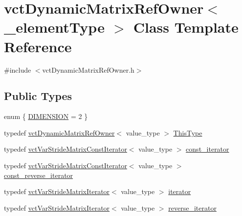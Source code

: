 \hypertarget{classvct_dynamic_matrix_ref_owner}{}\section{vct\+Dynamic\+Matrix\+Ref\+Owner$<$ \+\_\+element\+Type $>$ Class Template Reference}
\label{classvct_dynamic_matrix_ref_owner}


{\ttfamily \#include $<$vct\+Dynamic\+Matrix\+Ref\+Owner.\+h$>$}

\subsection*{Public Types}
\begin{DoxyCompactItemize}
\item 
enum \{ \hyperlink{classvct_dynamic_matrix_ref_owner_af13d59ea37e2deaafd66ed04d22db916ae19d71a7e9eb96879fbbe0b8acea6fae}{D\+I\+M\+E\+N\+S\+I\+O\+N} = 2
 \}
\item 
typedef \hyperlink{classvct_dynamic_matrix_ref_owner}{vct\+Dynamic\+Matrix\+Ref\+Owner}$<$ value\+\_\+type $>$ \hyperlink{classvct_dynamic_matrix_ref_owner_a004c89da7faff7d573988fc3b9ec43d9}{This\+Type}
\item 
typedef \hyperlink{classvct_var_stride_matrix_const_iterator}{vct\+Var\+Stride\+Matrix\+Const\+Iterator}$<$ value\+\_\+type $>$ \hyperlink{classvct_dynamic_matrix_ref_owner_a7a8df19473cc2e95e25c4d1bf4bacbe4}{const\+\_\+iterator}
\item 
typedef \hyperlink{classvct_var_stride_matrix_const_iterator}{vct\+Var\+Stride\+Matrix\+Const\+Iterator}$<$ value\+\_\+type $>$ \hyperlink{classvct_dynamic_matrix_ref_owner_a50c3b985899b0d6cb2f9fab9f8305207}{const\+\_\+reverse\+\_\+iterator}
\item 
typedef \hyperlink{classvct_var_stride_matrix_iterator}{vct\+Var\+Stride\+Matrix\+Iterator}$<$ value\+\_\+type $>$ \hyperlink{classvct_dynamic_matrix_ref_owner_aaf9f6aaf86c05aec0bcd354d40c11863}{iterator}
\item 
typedef \hyperlink{classvct_var_stride_matrix_iterator}{vct\+Var\+Stride\+Matrix\+Iterator}$<$ value\+\_\+type $>$ \hyperlink{classvct_dynamic_matrix_ref_owner_a133b22e9f6b4e7a20998ad3db72ed6c3}{reverse\+\_\+iterator}
\end{DoxyCompactItemize}
